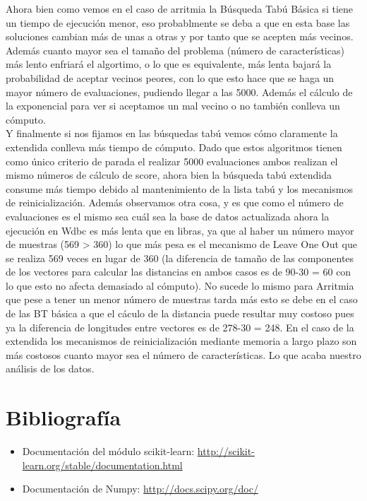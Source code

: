\documentclass[10pt,a4paper]{article}
\begin{document}
Ahora bien como vemos en el caso de arritmia la Búsqueda Tabú Básica si tiene un tiempo de ejecución menor, eso probablmente se deba a que en esta base las soluciones cambian más de unas a otras y por tanto que se acepten más vecinos. Además cuanto mayor sea el tamaño del problema (número de características) más lento enfriará el algortimo, o lo que es equivalente, más lenta bajará la probabilidad de aceptar vecinos peores, con lo que esto hace que se haga un mayor número de evaluaciones, pudiendo llegar a las 5000. Además el cálculo de la exponencial para ver si aceptamos un mal vecino o no también conlleva un cómputo.\\

Y finalmente si nos fijamos en las búsquedas tabú vemos cómo claramente la extendida conlleva más tiempo de cómputo. Dado que estos algoritmos tienen como único criterio de parada el realizar 5000 evaluaciones ambos realizan  el mismo números de cálculo de score, ahora bien la búsqueda tabú extendida consume más tiempo debido al mantenimiento de la lista tabú y los mecanismos de reinicialización. Además observamos otra cosa, y es que como el número de evaluaciones es el mismo sea cuál sea la base de datos actualizada ahora la ejecución en Wdbc es más lenta que en libras, ya que al haber un número mayor de muestras (569 > 360) lo que más pesa es el mecanismo de Leave One Out que se realiza 569 veces en lugar de 360 (la diferencia de tamaño de las componentes de los vectores para calcular las distancias en ambos casos es de 90-30 = 60 con lo que esto no afecta demasiado al cómputo). No sucede lo mismo para Arritmia que pese a tener un menor número de muestras tarda más esto se debe en el caso de las BT básica a que el cáculo de la distancia puede resultar muy costoso pues ya la diferencia de longitudes entre vectores es de 278-30 = 248. En el caso de la extendida los mecanismos de reinicialización mediante memoria a largo plazo son más costosos cuanto mayor sea el número de características. Lo que acaba nuestro análisis de los datos.

\newpage
\section{\color[rgb]{0.0,0.0,0.21}Bibliografía}

\begin{itemize}
\item Documentación del módulo scikit-learn: \url{http://scikit-learn.org/stable/documentation.html}
\item Documentación de Numpy: \url{http://docs.scipy.org/doc/}
\end{itemize}
\end{document}
